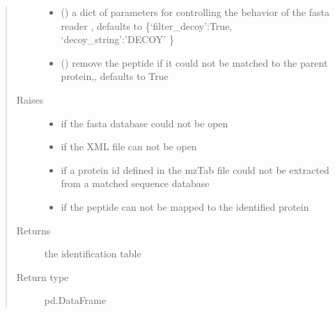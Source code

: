 \documentclass[letterpaper,10pt,english]{sphinxmanual}
\begin{document}
\begin{fulllineitems}
\begin{quote}
\begin{description}
\begin{itemize}
\item {} 
 (\sphinxstyleliteralemphasis{\sphinxupquote{{[}}}\sphinxstyleliteralemphasis{\sphinxupquote{,}}\sphinxstyleliteralemphasis{\sphinxupquote{{]}}}\sphinxstyleliteralemphasis{\sphinxupquote{, }}) \textendash{} a dict of parameters for controlling the behavior of the fasta reader , defaults to \{‘filter\_decoy’:True, ‘decoy\_string’:’DECOY’ \}

\item {} 
 (\sphinxstyleliteralemphasis{\sphinxupquote{, }}) \textendash{} remove the peptide if it could not be matched to the parent protein,, defaults to True

\end{itemize}

\item[{Raises}] \leavevmode\begin{itemize}
\item {} 
 \textendash{} if the fasta database could not be open

\item {} 
 \textendash{} if the XML file can not be open

\item {} 
 \textendash{} if a protein id defined in the mzTab file could not be extracted from a matched sequence database

\item {} 
 \textendash{} if the peptide can not be mapped to the identified protein

\end{itemize}

\item[{Returns}] \leavevmode
the identification table

\item[{Return type}] \leavevmode
pd.DataFrame

\end{description}\end{quote}

\end{fulllineitems}
\end{document}

